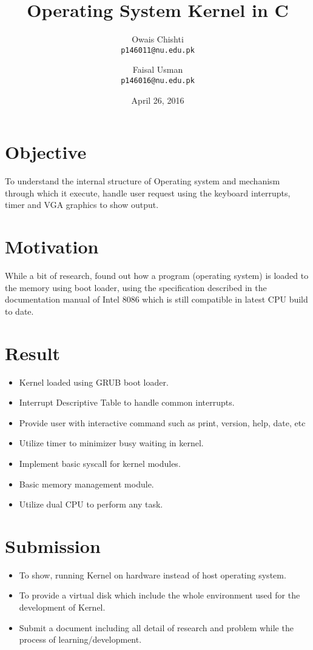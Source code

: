 \documentclass[11pt]{article}
\title{\vspace{-1cm}Operating System Kernel in C}
\date{April 26, 2016}
\author{
	Owais Chishti\\
	\texttt{p146011@nu.edu.pk}
	\and	
	Faisal Usman\\
	\texttt{p146016@nu.edu.pk}
}
\begin{document}
\maketitle

\section{Objective}
To understand the internal structure of Operating system and mechanism through which it execute, handle user request using the keyboard interrupts, timer and VGA graphics to show output.  

\section{Motivation}
While a bit of research, found out how a program (operating system) is loaded to the memory using boot loader, using the specification described in the documentation manual of Intel 8086 which is still compatible in latest CPU build to date.

\section{Result}
\begin{itemize}  
	\item Kernel loaded using GRUB boot loader.
	\item Interrupt Descriptive Table to handle common interrupts.
	\item Provide user with interactive command such as print, version, help, date, etc
	\item Utilize timer to minimizer busy waiting in kernel.
	\item Implement basic syscall for kernel modules.
	\item Basic memory management module.
	\item Utilize dual CPU to perform any task.
\end{itemize}

\section{Submission}
\begin{itemize}  
	\item To show, running Kernel on hardware instead of host operating system.
	\item To provide a virtual disk which include the whole environment used for the development of Kernel.
	\item Submit a document including all detail of research and problem while the process of learning/development.
\end{itemize}
\end{document}
